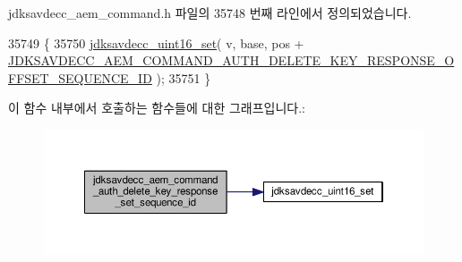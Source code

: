 jdksavdecc\+\_\+aem\+\_\+command.\+h 파일의 35748 번째 라인에서 정의되었습니다.


\begin{DoxyCode}
35749 \{
35750     \hyperlink{group__endian_ga14b9eeadc05f94334096c127c955a60b}{jdksavdecc\_uint16\_set}( v, base, pos + 
      \hyperlink{group__command__auth__delete__key__response_gaa6578c46762f097f9e3333cc09d71dd0}{JDKSAVDECC\_AEM\_COMMAND\_AUTH\_DELETE\_KEY\_RESPONSE\_OFFSET\_SEQUENCE\_ID}
       );
35751 \}
\end{DoxyCode}


이 함수 내부에서 호출하는 함수들에 대한 그래프입니다.\+:
\nopagebreak
\begin{figure}[H]
\begin{center}
\leavevmode
\includegraphics[width=350pt]{group__command__auth__delete__key__response_gae070db1c3c2b07b6ed7a9b12a7d92293_cgraph}
\end{center}
\end{figure}


